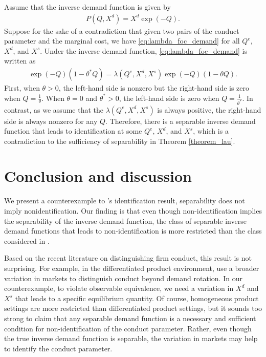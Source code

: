 \documentclass[11pt, a4paper]{article}
\theoremstyle{remark}
\begin{document}
Assume that the inverse demand function is given by
\begin{align}
    P(Q, X^{d}) = X^{d}\exp(-Q).
\end{align}
Suppose for the sake of a contradiction that given two pairs of the conduct parameter and the marginal cost, we have \eqref{eq:lambda_foc_demand} for all $Q^e$, $X^{d}$, and $X^{s}$.
Under the inverse demand function, \eqref{eq:lambda_foc_demand} is written as
\begin{align}
    \exp(-Q)(1 -\theta^{*} Q) = \lambda(Q^e, X^{d}, X^{s}) \exp(-Q)(1 - \theta Q).
\end{align}
First, when $\theta >0$, the left-hand side is nonzero but the right-hand side is zero when $Q = \frac{1}{\theta}$.
When $\theta = 0$ and $\theta^{*} >0$, the left-hand side is zero when $Q = \frac{1}{\theta^{*}}$.
In contrast, as we assume that the $\lambda(Q^e, X^{d}, X^{s})$ is always positive, the right-hand side is always nonzero for any $Q$.
Therefore, there is a separable inverse demand function that leads to identification at some $Q^e$, $X^{d}$, and $X^{s}$, which is a contradiction to the sufficiency of separability in Theorem \ref{theorem_lau}.






\section{Conclusion and discussion}

We present a counterexample to \citet{lau1982identifying}'s identification result, separability does not imply nonidentification.
Our finding is that even though non-identification implies the separability of the inverse demand function, the class of separable inverse demand functions that leads to non-identification is more restricted than the class considered in \citet{lau1982identifying}.

Based on the recent literature on distinguishing firm conduct, this result is not surprising.
For example, in the differentiated product environment, \citet{berry2014identification}  use a broader variation in markets to distinguish conduct beyond demand rotation.
In our counterexample, to violate observable equivalence, we need a variation in $X^{d}$ and $X^{s}$ that leads to a specific equilibrium quantity.
Of course, homogeneous product settings are more restricted than differentiated product settings, but it sounds too strong to claim that any separable demand function is a necessary and sufficient condition for non-identification of the conduct parameter.
Rather, even though the true inverse demand function is separable, the variation in markets may help to identify the conduct parameter.
\end{document}
